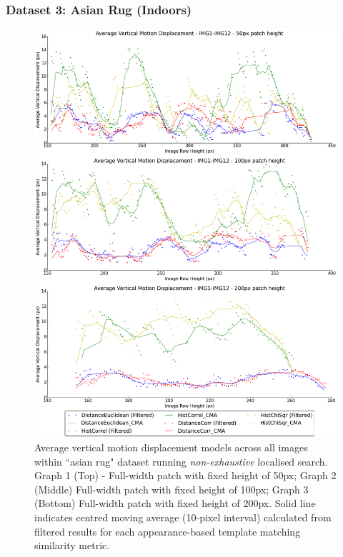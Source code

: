 \clearpage
\subsubsection{Dataset 3: Asian Rug (Indoors)}

\begin{figure}[ht!]
\centering
\includegraphics[scale=0.3]{images/results/wiltshire_inside_10cm_non_scaled}
\caption{Average vertical motion displacement models across all images within ``asian rug" dataset running \textit{non-exhaustive} localised search. Graph 1 (Top) - Full-width patch with fixed height of 50px; Graph 2 (Middle) Full-width patch with fixed height of 100px; Graph 3 (Bottom) Full-width patch with fixed height of 200px. Solid line indicates centred moving average (10-pixel interval) calculated from filtered results for each appearance-based template matching similarity metric.}
\label{fig:ex2_3_1}
\end{figure}

